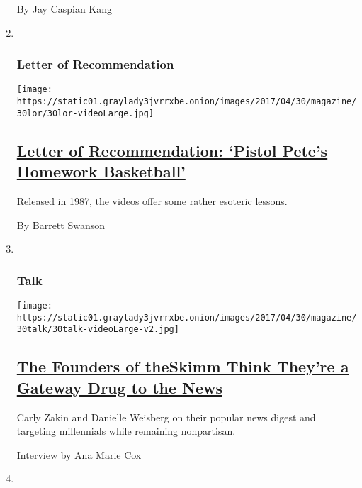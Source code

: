 \begin{enumerate}
  By Jay Caspian Kang
\item ~
  \hypertarget{letter-of-recommendation}{%
  \subsubsection{Letter of
  Recommendation}\label{letter-of-recommendation}}

  \texttt{[image: https://static01.graylady3jvrrxbe.onion/images/2017/04/30/magazine/30lor/30lor-videoLarge.jpg]}

  \hypertarget{letter-of-recommendation-pistol-petes-homework-basketball}{%
  \subsection{\texorpdfstring{\href{/2017/04/27/magazine/letter-of-recommendation-pistol-petes-homework-basketball.html}{Letter
  of Recommendation: `Pistol Pete's Homework
  Basketball'}}{Letter of Recommendation: `Pistol Pete's Homework Basketball'}}\label{letter-of-recommendation-pistol-petes-homework-basketball}}

  Released in 1987, the videos offer some rather esoteric lessons.

  By Barrett Swanson
\item ~
  \hypertarget{talk}{%
  \subsubsection{Talk}\label{talk}}

  \texttt{[image: https://static01.graylady3jvrrxbe.onion/images/2017/04/30/magazine/30talk/30talk-videoLarge-v2.jpg]}

  \hypertarget{the-founders-of-theskimm-think-theyre-a-gateway-drug-to-the-news}{%
  \subsection{\texorpdfstring{\href{/2017/04/26/magazine/the-founders-of-theskimm-think-theyre-a-gateway-drug-to-the-news.html}{The
  Founders of theSkimm Think They're a Gateway Drug to the
  News}}{The Founders of theSkimm Think They're a Gateway Drug to the News}}\label{the-founders-of-theskimm-think-theyre-a-gateway-drug-to-the-news}}

  Carly Zakin and Danielle Weisberg on their popular news digest and
  targeting millennials while remaining nonpartisan.

  Interview by Ana Marie Cox
\item ~
  \hypertarget{eat}{%
}
\end{enumerate}
